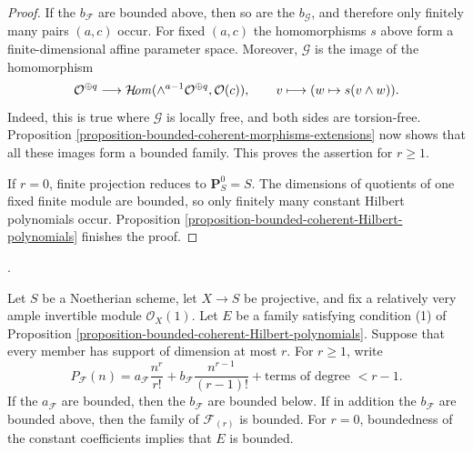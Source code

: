 \begin{proof}
If the $b_{\mathcal{F}}$ are bounded above, then so are the
$b_{\mathcal{G}}$, and therefore only finitely many pairs $(a,c)$ occur. For
fixed $(a,c)$ the homomorphisms $s$ above form a finite-dimensional affine
parameter space. Moreover, $\mathcal{G}$ is the image of the homomorphism
$$
\mathcal{O}^{\oplus q}\longrightarrow
\mathop{\mathcal{H}\!\mathit{om}}\nolimits(\wedge^{a-1}\mathcal{O}^{\oplus q},\mathcal{O}(c)),
\qquad
v\longmapsto(w\mapsto s(v\wedge w)).
$$
Indeed, this is true where $\mathcal{G}$ is locally free, and both sides are
torsion-free. Proposition
\ref{proposition-bounded-coherent-morphisms-extensions} now shows that all
these images form a bounded family. This proves the assertion for $r\geq1$.

If $r=0$, finite projection reduces to $\mathbf{P}^0_S=S$. The dimensions of
quotients of one fixed finite module are bounded, so only finitely many
constant Hilbert polynomials occur. Proposition
\ref{proposition-bounded-coherent-Hilbert-polynomials} finishes the proof.
\end{proof}

\begin{proposition}
\label{proposition-bounded-top-dimensional-pieces}
\begin{reference}
\cite[Expos\'e 221, Lemma 2.6, pp. 257--258]{FGA}.
\end{reference}
Let $S$ be a Noetherian scheme, let $X\to S$ be projective, and fix a
relatively very ample invertible module $\mathcal{O}_X(1)$. Let $E$ be a
family satisfying condition (1) of Proposition
\ref{proposition-bounded-coherent-Hilbert-polynomials}. Suppose that every
member has support of dimension at most $r$. For $r\geq1$, write
$$
P_{\mathcal{F}}(n)=
a_{\mathcal{F}}\frac{n^r}{r!}+
b_{\mathcal{F}}\frac{n^{r-1}}{(r-1)!}+
\text{terms of degree }<r-1.
$$
If the $a_{\mathcal{F}}$ are bounded, then the $b_{\mathcal{F}}$ are bounded
below. If in addition the $b_{\mathcal{F}}$ are bounded above, then the family
of $\mathcal{F}_{(r)}$ is bounded. For $r=0$, boundedness of the constant
coefficients implies that $E$ is bounded.
\end{proposition}

